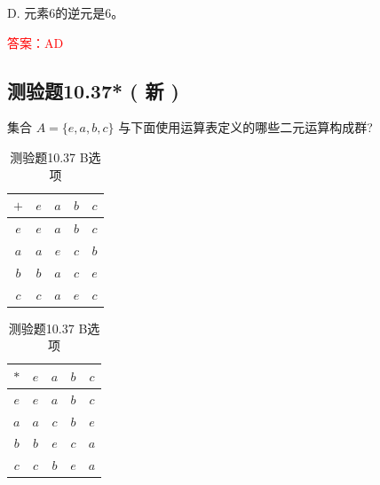 \documentclass[UTF8, heading=true]{ctexart}
\begin{document}
D. 元素6的逆元是6。

\textcolor{red}{答案：AD}

\subsection{测验题10.37* ( 新 )}

集合 $A=\{e, a, b, c\}$  与下面使用运算表定义的哪些二元运算构成群?

\begin{table}[H]
  \centering
  \renewcommand{\arraystretch}{1.3}
  \begin{minipage}{0.45\textwidth}
    \centering
    \begin{tabular}{c|cccc}
      \hline
      $+$ & $e$ & $a$ & $b$ & $c$ \\
      \hline
      $e$ & $e$ & $a$ & $b$ & $c$ \\
      $a$ & $a$ & $e$ & $c$ & $b$ \\
      $b$ & $b$ & $a$ & $c$ & $e$ \\
      $c$ & $c$ & $a$ & $e$ & $c$ \\
      \hline
    \end{tabular}
    \vspace{0.5cm}
    \caption{测验题10.37 A选项}
  \end{minipage}
  \hspace{0.05\textwidth}
  \begin{minipage}{0.45\textwidth}
    \centering
    \begin{tabular}{c|cccc}
      \hline
      $*$ & $e$ & $a$ & $b$ & $c$ \\
      \hline
      $e$ & $e$ & $a$ & $b$ & $c$ \\
      $a$ & $a$ & $c$ & $b$ & $e$ \\
      $b$ & $b$ & $e$ & $c$ & $a$ \\
      $c$ & $c$ & $b$ & $e$ & $a$ \\
      \hline
    \end{tabular}
    \vspace{0.5cm}
    \caption{测验题10.37 B选项}
  \end{minipage}
\end{table}
\end{document}
